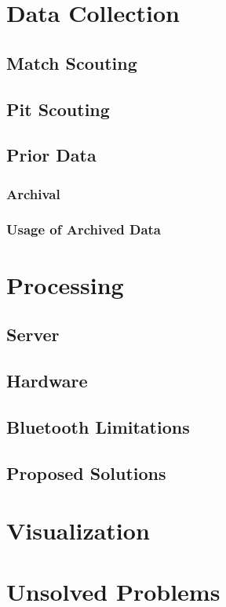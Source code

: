 \documentclass[11pt]{report}
\begin{document}
\section{Data Collection}
\subsection{Match Scouting}
\subsection{Pit Scouting}
\subsection{Prior Data}
\subsubsection{Archival}
\subsubsection{Usage of Archived Data}

\section{Processing}
\subsection {Server}
\subsection{Hardware}
\subsection{Bluetooth Limitations}
\subsection{Proposed Solutions}

\section{Visualization}
\label{sec:visualization}

\section{Unsolved Problems}
\end{document}
